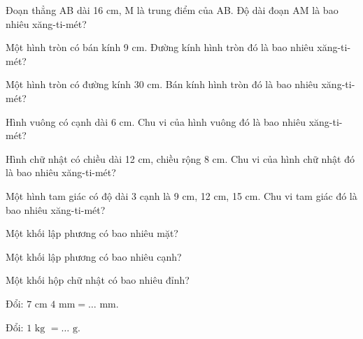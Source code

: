 \begin{ex}
Đoạn thẳng AB dài 16 cm, M là trung điểm của AB. Độ dài đoạn AM là bao nhiêu xăng-ti-mét?
\end{ex}

\begin{ex}
Một hình tròn có bán kính 9 cm. Đường kính hình tròn đó là bao nhiêu xăng-ti-mét?
\end{ex}

\begin{ex}
Một hình tròn có đường kính 30 cm. Bán kính hình tròn đó là bao nhiêu xăng-ti-mét?
\end{ex}

\begin{ex}
Hình vuông có cạnh dài 6 cm. Chu vi của hình vuông đó là bao nhiêu xăng-ti-mét?
\end{ex}

\begin{ex}
Hình chữ nhật có chiều dài 12 cm, chiều rộng 8 cm. Chu vi của hình chữ nhật đó là bao nhiêu xăng-ti-mét?
\end{ex}

\begin{ex}
Một hình tam giác có độ dài 3 cạnh là 9 cm, 12 cm, 15 cm. Chu vi tam giác đó là bao nhiêu xăng-ti-mét?
\end{ex}

\begin{ex}
Một khối lập phương có bao nhiêu mặt?
\end{ex}

\begin{ex}
Một khối lập phương có bao nhiêu cạnh?
\end{ex}

\begin{ex}
Một khối hộp chữ nhật có bao nhiêu đỉnh?
\end{ex}

\begin{ex}
Đổi: $7\text{ cm } 4\text{ mm} = \dots\text{ mm}$.
\end{ex}

\begin{ex}
Đổi: $1\text{ kg } = \dots\text{ g}$.
\end{ex}

